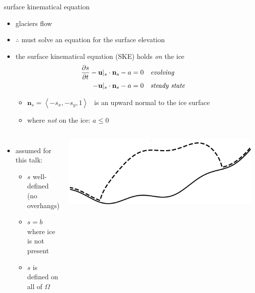 \documentclass[usepdftitle=false]{beamer}
\newcommand{\bn}{\mathbf{n}}
\newcommand{\bu}{\mathbf{u}}
\begin{document}
\begin{frame}{surface kinematical equation}

\begin{itemize}
\item glaciers flow
\item $\therefore$ must solve an equation for the surface elevation
\item the surface kinematical equation (SKE) holds \emph{on} the ice
\begin{align*}
\frac{\partial s}{\partial t} - \bu|_s \cdot \bn_s - a &= 0 & &\text{\emph{evolving}} \\
-\bu|_s \cdot \bn_s - a &= 0 & &\text{\emph{steady state}}
\end{align*}

    \begin{itemize}
    \item $\bn_s = \left<-s_x,-s_y,1\right>$  \, is an upward normal to the ice surface
    \item where \emph{not} on the ice: $a\le 0$
    \end{itemize}
\end{itemize}

\bigskip
\begin{columns}
        \begin{itemize}
        \item assumed for this talk:
            \begin{itemize}
            \item $s$ well-defined (no overhangs)
            \item $s=b$ where ice is not present
            \item $s$ is defined on all of $\Omega$
            \end{itemize}
        \end{itemize}
        \includegraphics[width=1.0\textwidth]{figs/simpledomain.png}
\end{columns}
\end{frame}
\end{document}
